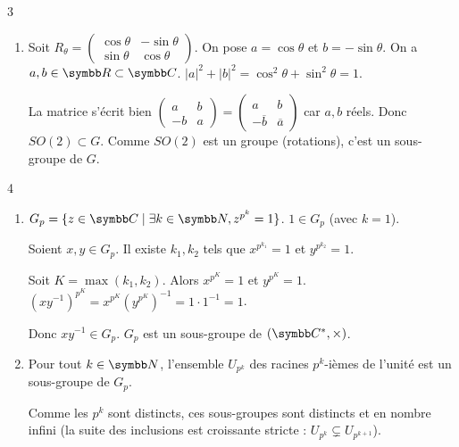 \begin{correction}{3}
\begin{enumerate}
    \item Soit $R_\theta = \begin{pmatrix}\cos\theta&-\sin\theta\\ \sin\theta&\cos\theta\end{pmatrix}$.
    On pose $a=\cos\theta$ et $b=-\sin\theta$. On a $a,b \in \R \subset \C$.
    $|a|^2+|b|^2 = \cos^2\theta + \sin^2\theta = 1$.

    La matrice s'écrit bien $\begin{pmatrix}a&b\\ -b&a\end{pmatrix} = \begin{pmatrix}a&b\\ -\overline{b}&\overline{a}\end{pmatrix}$ car $a,b$ réels.
    Donc $SO(2) \subset G$. Comme $SO(2)$ est un groupe (rotations), c'est un sous-groupe de $G$.
\end{enumerate}
\end{correction}

\begin{correction}{4}
\begin{enumerate}
    \item $G_p = \{ z \in \C \mid \exists k \in \N, z^{p^k}=1 \}$.
    $1 \in G_p$ (avec $k=1$).

    Soient $x, y \in G_p$. Il existe $k_1, k_2$ tels que $x^{p^{k_1}}=1$ et $y^{p^{k_2}}=1$.

    Soit $K = \max(k_1, k_2)$. Alors $x^{p^K}=1$ et $y^{p^K}=1$.
    $(xy^{-1})^{p^K} = x^{p^K} (y^{p^K})^{-1} = 1 \cdot 1^{-1} = 1$.

    Donc $xy^{-1} \in G_p$. $G_p$ est un sous-groupe de $(\C^*, \times)$.

    \item Pour tout $k \in \N$, l'ensemble $U_{p^k}$ des racines $p^k$-ièmes de l'unité est un sous-groupe de $G_p$.

    Comme les $p^k$ sont distincts, ces sous-groupes sont distincts et en nombre infini 
    (la suite des inclusions est croissante stricte : $U_{p^k} \subsetneq U_{p^{k+1}}$).
\end{enumerate}
\end{correction}

